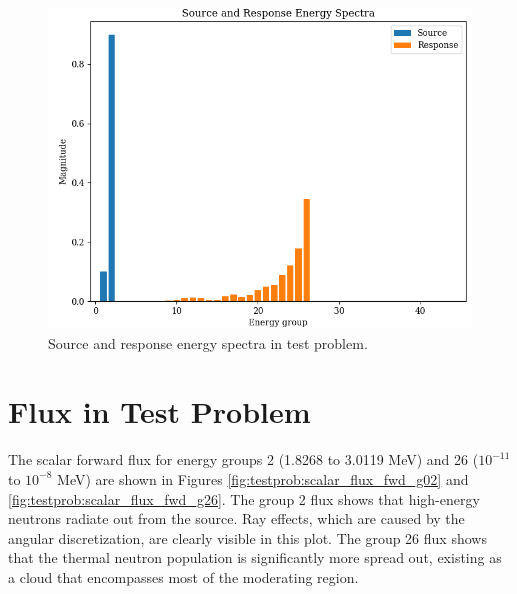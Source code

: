 \begin{figure}
  \centering
  \includegraphics[width=0.5\linewidth]{content/testprob/spectra_lin.png}
  \caption{Source and response energy spectra in test problem.}
  \label{fig:testprob:spectra_lin}
\end{figure}

\section{Flux in Test Problem}
\label{sec:bg:tp:flux}


The scalar forward flux for energy groups 2 (1.8268 to 3.0119 MeV) and 26 ($10^{-11}$ to $10^{-8}$ MeV) are shown in Figures \ref{fig:testprob:scalar_flux_fwd_g02} and \ref{fig:testprob:scalar_flux_fwd_g26}.
The group 2 flux shows that high-energy neutrons radiate out from the source.
Ray effects, which are caused by the angular discretization, are clearly visible in this plot.
The group 26 flux shows that the thermal neutron population is significantly more spread out, existing as a cloud that encompasses most of the moderating region.

